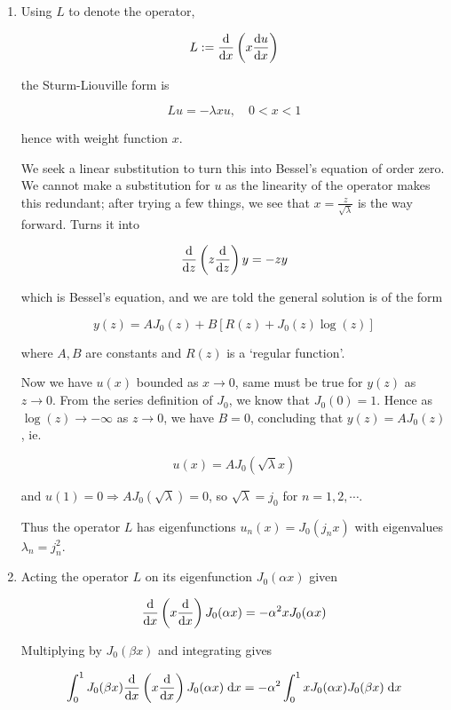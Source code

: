 \documentclass[a4paper]{article}
\begin{document}
\begin{enumerate}
	\item Using $ L $ to denote the operator, 

\[ L : = \frac{\mathrm{d} }{\mathrm{d} x} \left(  x \frac{\mathrm{d} u}{\mathrm{d} x} \right)  \]

the Sturm-Liouville form is

\[ L u = - \lambda x u , \quad 0 < x < 1  \]

hence with weight function $ x $.

We seek a linear substitution to turn this into Bessel's equation of order zero. We cannot make a substitution for $ u $ as the linearity of the operator makes this redundant; after trying a few things, we see that $ x = \frac{z}{\sqrt{\lambda}} $ is the way forward. Turns it into

\[ \frac{\mathrm{d} }{\mathrm{d} z} \left(  z \frac{\mathrm{d}}{\mathrm{d} z} \right) y = - z y   \]

which is Bessel's equation, and we are told the general solution is of the form

\[ y(z) = A J_{0}(z) + B[ R(z) + J_{0}(z)\log(z) ] \]

where $ A,B $ are constants and $ R(z) $ is a `regular function'.

Now we have $ u(x) $ bounded as $ x \to 0 $, same must be true for $ y(z) $ as $ z \to 0 $. From the series definition of $ J_{0} $, we know that $ J_{0}(0) = 1 $. Hence as $ \log(z) \to - \infty $ as $ z \to 0 $, we have $ B = 0 $, concluding that $ y(z) = A J_{0}(z) $, ie. 

\[ u(x) = A J_{0} (\sqrt{\lambda}  x)  \]

and $ u(1) = 0 \Rightarrow A J_{0} (\sqrt{\lambda}) = 0 $, so $ \sqrt{\lambda} = j_{0} $ for $ n = 1,2,\cdots $.

Thus the operator $ L $ has eigenfunctions $ u_{n}(x) = J_{0}(j_{n}x) $ with eigenvalues $ \lambda_{n} = j_{n}^{2} $.


\item Acting the operator $ L $ on its eigenfunction $ J_{0}(\alpha x) $ given 

\[ \frac{\mathrm{d} }{\mathrm{d} x}\left(  x \frac{\mathrm{d} }{\mathrm{d} x} \right) J_{0}(\alpha x) = - \alpha^{2} x J_{0} (\alpha x)  \]

Multiplying by $ J_{0}(\beta x) $ and integrating gives

\[ \int_{0}^{1}  J_{0}(\beta x) \frac{\mathrm{d} }{\mathrm{d} x}\left(  x \frac{\mathrm{d} }{\mathrm{d} x} \right) J_{0}(\alpha x) \; \mathrm{d} x = - \alpha^{2} \int_{0}^{1}  x J_{0} (\alpha x)J_{0}(\beta x ) \; \mathrm{d} x \]


\end{enumerate}
\end{document}

